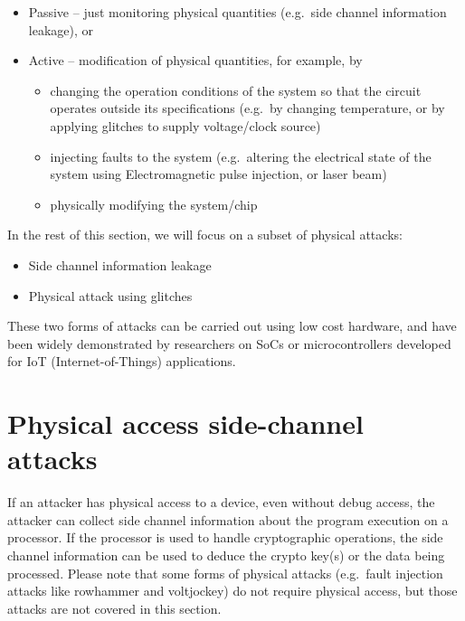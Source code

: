 \documentclass[a4paper,]{report}
\providecommand{\tightlist}{%
  \setlength{\itemsep}{0pt}\setlength{\parskip}{0pt}}
\begin{document}
\begin{itemize}
\tightlist
\item
  Passive -- just monitoring physical quantities (e.g.~side channel
  information leakage), or
\item
  Active -- modification of physical quantities, for example, by

  \begin{itemize}
  \tightlist
  \item
    changing the operation conditions of the system so that the circuit
    operates outside its specifications (e.g.~by changing temperature,
    or by applying glitches to supply voltage/clock source)
  \item
    injecting faults to the system (e.g.~altering the electrical state
    of the system using Electromagnetic pulse injection, or laser beam)
  \item
    physically modifying the system/chip
  \end{itemize}
\end{itemize}

In the rest of this section, we will focus on a subset of physical
attacks:

\begin{itemize}
\tightlist
\item
  Side channel information leakage
\item
  Physical attack using glitches
\end{itemize}

These two forms of attacks can be carried out using low cost hardware,
and have been widely demonstrated by researchers on SoCs or
microcontrollers developed for IoT (Internet-of-Things) applications.

\hypertarget{physical-access-side-channel-attacks-1}{%
\section{Physical access side-channel
attacks}\label{physical-access-side-channel-attacks-1}}

If an attacker has physical access to a device, even without debug
access, the attacker can collect side channel information about the
program execution on a processor. If the processor is used to handle
cryptographic operations, the side channel information can be used to
deduce the crypto key(s) or the data being processed. Please note that
some forms of physical attacks (e.g.~fault injection attacks like
rowhammer and voltjockey) do not require physical access, but those
attacks are not covered in this section.
\end{document}
